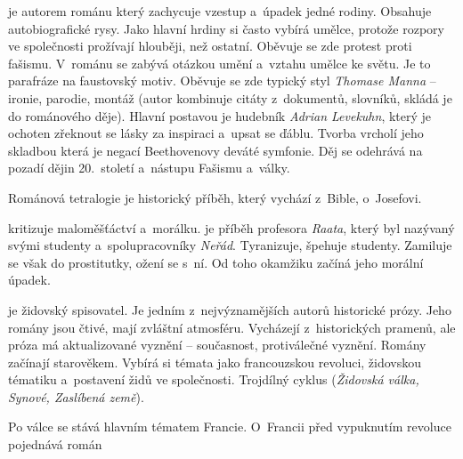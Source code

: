 \delic

 je autorem románu  který
zachycuje vzestup a~úpadek jedné rodiny. Obsahuje autobiografické rysy.
Jako hlavní hrdiny si často vybírá umělce, protože rozpory ve
společnosti prožívají hlouběji, než ostatní. Oběvuje se zde protest
proti fašismu. V~románu  se zabývá otázkou umění
a~vztahu umělce ke světu. Je to parafráze na faustovský motiv. Oběvuje se
zde typický styl \emph{Thomase Manna} -- ironie, parodie, montáž (autor
kombinuje citáty z~dokumentů, slovníků, skládá je do románového děje).
Hlavní postavou je hudebník \emph{Adrian Levekuhn}, který je ochoten
zřeknout se lásky za inspiraci a~upsat se ďáblu. Tvorba vrcholí jeho
skladbou  která je negací Beethovenovy deváté symfonie.
Děj se odehrává na pozadí dějin 20.~století a~nástupu Fašismu a~války.

Románová tetralogie  je historický příběh,
který vychází z~Bible, o~Josefovi.

\delic

 kritizuje maloměšťáctví a~morálku.  je příběh profesora \emph{Raata}, který byl nazývaný svými
studenty a~spolupracovníky \emph{Neřád}. Tyranizuje, špehuje studenty.
Zamiluje se však do prostitutky, ožení se s~ní. Od toho okamžiku začíná
jeho morální úpadek.

\delic

 je židovský spisovatel. Je jedním
z~nejvýznamějších autorů historické prózy. Jeho romány jsou čtivé, mají
zvláštní atmosféru. Vycházejí z~historických pramenů, ale próza má
aktualizované vyznění -- současnost, protiválečné vyznění. Romány
začínají starověkem. Vybírá si témata jako francouzskou revoluci,
židovskou tématiku a~postavení židů ve společnosti. Trojdílný cyklus
 (\emph{Židovská válka, Synové, Zaslíbená země}).

Po válce se stává hlavním tématem Francie. O~Francii před vypuknutím
revoluce pojednává román 











